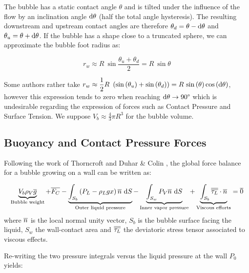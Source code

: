 The bubble has a static contact angle $\theta$ and is tilted under the influence of the flow by an inclination angle $\mathrm{d}\theta$ (half the total angle hysteresis). The resulting downstream and upstream contact angles are therefore $\theta_{d}=\theta-\mathrm{d}\theta$ and $\theta_{u}=\theta+\mathrm{d}\theta$. If the bubble has a shape close to a truncated sphere, we can approximate the bubble foot radius as:

\begin{equation}
r_{w} \approx R~ \sin{\frac{\theta_{u}+\theta_{d}}{2}}=R~ \sin{\theta}
\label{eq:rw}
\end{equation}

Some authors rather take $r_{w}\approx \dfrac{1}{2} R~\left( \mathrm{sin}\left( \theta_{u} \right) + \mathrm{sin}\left( \theta_{d} \right)  \right)=R~\mathrm{sin}\left( \theta \right)\mathrm{cos}\left( \mathrm{d}\theta \right)$, however this expression tends to zero when reaching $\mathrm{d}\theta \to 90\degree$ which is undesirable regarding the expression of forces such as Contact Pressure and Surface Tension. We suppose $V_{b}\approx\frac{4}{3}\pi R^{3}$ for the bubble volume.





\subsection{Buoyancy and Contact Pressure Forces}

Following the work of Thorncroft \etal \cite{thorncroft_bubble_2001} and Duhar \& Colin \cite{duhar_dynamics_2006}, the global force balance for a bubble growing on a wall can be written as:

\begin{equation}
\underbrace{ V_{b} \rho_{V} \overline{g}}_{\text{Bubble weight}} + \overline{F_{C}} - \underbrace{ \int_{S_{b}} \left( P_{L} - \rho_{L}gx \right) \overline{n}\ \mathrm{d}S }_{\text{Outer liquid pressure}} - \underbrace{ \int_{S_{w}} P_{V} \overline{n}\ \mathrm{d}S }_{\text{Inner vapor pressure}} + \underbrace{ \int_{S_{b}} \overline{\overline{\tau_{L}}}\cdot \overline{n} }_{\text{Viscous efforts}} = \overline{0}
\end{equation}
where $\overline{n}$ is the local normal unity vector, $S_{b}$ is the bubble surface facing the liquid, $S_{w}$ the wall-contact area and $\overline{\overline{\tau_{L}}}$ the deviatoric stress tensor associated to viscous effects.

\npar

Re-writing the two pressure integrals versus the liquid pressure at the wall $P_{0}$ yields:

